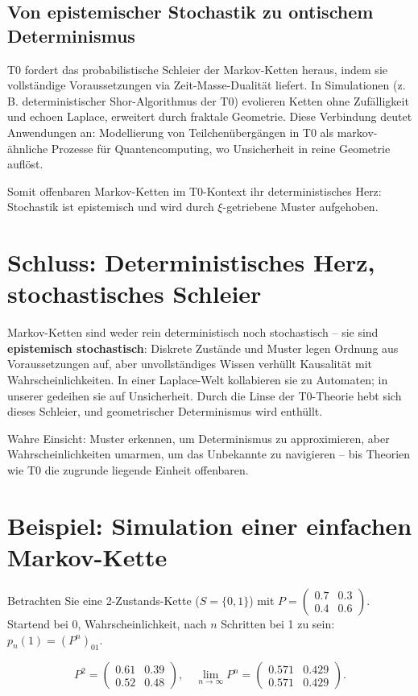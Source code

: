 	\subsection{Von epistemischer Stochastik zu ontischem Determinismus}
	T0 fordert das probabilistische Schleier der Markov-Ketten heraus, indem sie vollständige Voraussetzungen via Zeit-Masse-Dualität liefert. In Simulationen (z. B. deterministischer Shor-Algorithmus der T0) evolieren Ketten ohne Zufälligkeit und echoen Laplace, erweitert durch fraktale Geometrie. Diese Verbindung deutet Anwendungen an: Modellierung von Teilchenübergängen in T0 als markov-ähnliche Prozesse für Quantencomputing, wo Unsicherheit in reine Geometrie auflöst.
	
	Somit offenbaren Markov-Ketten im T0-Kontext ihr deterministisches Herz: Stochastik ist epistemisch und wird durch $\xi$-getriebene Muster aufgehoben.
	
	\section{Schluss: Deterministisches Herz, stochastisches Schleier}
	
	Markov-Ketten sind weder rein deterministisch noch stochastisch – sie sind \textbf{epistemisch stochastisch}: Diskrete Zustände und Muster legen Ordnung aus Voraussetzungen auf, aber unvollständiges Wissen verhüllt Kausalität mit Wahrscheinlichkeiten. In einer Laplace-Welt kollabieren sie zu Automaten; in unserer gedeihen sie auf Unsicherheit. Durch die Linse der T0-Theorie hebt sich dieses Schleier, und geometrischer Determinismus wird enthüllt.
	
	Wahre Einsicht: Muster erkennen, um Determinismus zu approximieren, aber Wahrscheinlichkeiten umarmen, um das Unbekannte zu navigieren – bis Theorien wie T0 die zugrunde liegende Einheit offenbaren.
	
	\appendix
	\section{Beispiel: Simulation einer einfachen Markov-Kette}
	
	Betrachten Sie eine 2-Zustands-Kette ($S = \{0,1\}$) mit $P = \begin{pmatrix} 0.7 & 0.3 \\ 0.4 & 0.6 \end{pmatrix}$. Startend bei 0, Wahrscheinlichkeit, nach $n$ Schritten bei 1 zu sein: $p_n(1) = (P^n)_{01}$.
	
	\begin{equation}
		P^2 = \begin{pmatrix} 0.61 & 0.39 \\ 0.52 & 0.48 \end{pmatrix}, \quad \lim_{n\to\infty} P^n = \begin{pmatrix} 0.571 & 0.429 \\ 0.571 & 0.429 \end{pmatrix}.
	\end{equation}
	
